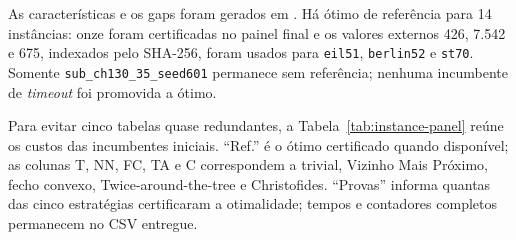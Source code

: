 \documentclass[12pt]{article}
\begin{document}
As características e os gaps foram gerados em
. Há ótimo de
referência para 14 instâncias: onze foram certificadas no painel final e os
valores externos 426, 7.542 e 675, indexados pelo SHA-256, foram usados para
\texttt{eil51}, \texttt{berlin52} e \texttt{st70}. Somente
\texttt{sub\_ch130\_35\_seed601} permanece sem referência; nenhuma incumbente
de \textit{timeout} foi promovida a ótimo.

Para evitar cinco tabelas quase redundantes, a Tabela~\ref{tab:instance-panel}
reúne os custos das incumbentes iniciais. ``Ref.'' é o ótimo certificado quando
disponível; as colunas T, NN, FC, TA e C correspondem a trivial, Vizinho Mais
Próximo, fecho convexo, Twice-around-the-tree e Christofides. ``Provas'' informa
quantas das cinco estratégias certificaram a otimalidade; tempos e contadores
completos permanecem no CSV entregue.
\end{document}
